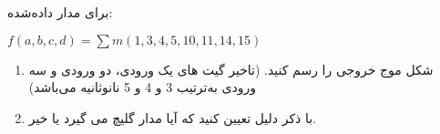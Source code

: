 برای مدار داده‌شده:

\begin{latin}
	$f(a,b,c,d)=\sum m(1,3,4,5,10,11,14,15)$
\end{latin}


\begin{enumerate}
	\item
	شکل موج خروجی را رسم کنید. (تاخیر گیت های یک ورودی، دو ورودی و سه ورودی به‌ترتیب 3 و 4 و 5 نانوثانیه می‌باشد)
	
	
	
	
	\item 
	با ذکر دلیل تعیین کنید که آیا مدار گلیچ می گیرد یا خیر. 
\end{enumerate}